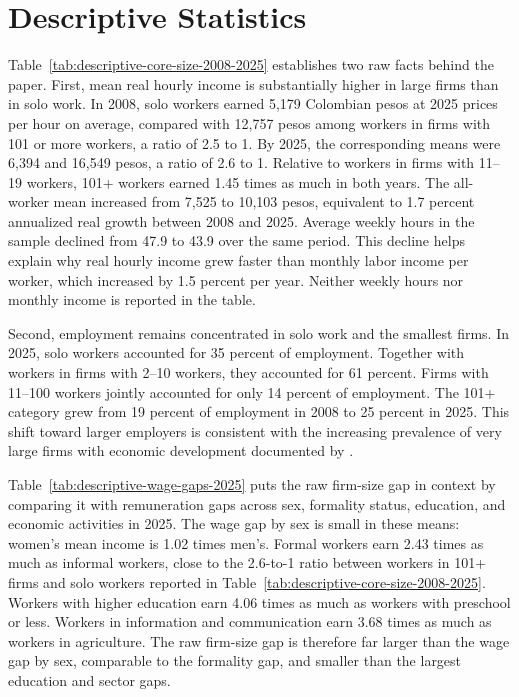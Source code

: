 \section{Descriptive Statistics}

Table~\ref{tab:descriptive-core-size-2008-2025} establishes two raw facts behind the paper. First, mean real hourly income is substantially higher in large firms than in solo work. In 2008, solo workers earned 5,179 Colombian pesos at 2025 prices per hour on average, compared with 12,757 pesos among workers in firms with 101 or more workers, a ratio of 2.5 to 1. By 2025, the corresponding means were 6,394 and 16,549 pesos, a ratio of 2.6 to 1. Relative to workers in firms with 11--19 workers, 101+ workers earned 1.45 times as much in both years. The all-worker mean increased from 7,525 to 10,103 pesos, equivalent to 1.7 percent annualized real growth between 2008 and 2025. Average weekly hours in the sample declined from 47.9 to 43.9 over the same period. This decline helps explain why real hourly income grew faster than monthly labor income per worker, which increased by 1.5 percent per year. Neither weekly hours nor monthly income is reported in the table.

Second, employment remains concentrated in solo work and the smallest firms. In 2025, solo workers accounted for 35 percent of employment. Together with workers in firms with 2--10 workers, they accounted for 61 percent. Firms with 11--100 workers jointly accounted for only 14 percent of employment. The 101+ category grew from 19 percent of employment in 2008 to 25 percent in 2025. This shift toward larger employers is consistent with the increasing prevalence of very large firms with economic development documented by \citet{Chen2026}.



Table~\ref{tab:descriptive-wage-gaps-2025} puts the raw firm-size gap in
context by comparing it with remuneration gaps across sex, formality status,
education, and economic activities in 2025. The wage gap by sex is small in
these means: women's mean income is 1.02 times men's. Formal workers earn 2.43 times as much as informal workers,
close to the 2.6-to-1 ratio between workers
in 101+ firms and solo workers reported in
Table~\ref{tab:descriptive-core-size-2008-2025}.
Workers with higher education earn 4.06 times as much as workers with
preschool or less. Workers in information and communication earn 3.68 times
as much as workers in agriculture. The raw
firm-size gap is therefore far larger than the wage gap by sex, comparable to
the formality gap, and smaller than the largest education and sector gaps.

